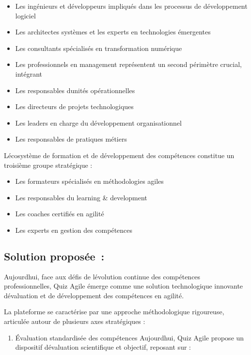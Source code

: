 \documentclass[12pt,a4paper,twoside,openright]{report}
\begin{document}
\begin{itemize}
\item
  Les ingénieurs et développeurs impliqués dans les processus de
  développement logiciel
\item
  Les architectes systèmes et les experts en technologies émergentes
\item
  Les consultants spécialisés en transformation numérique
\item
  Les professionnels en management représentent un second périmètre
  crucial, intégrant
\item
  Les responsables d\textquotesingle unités opérationnelles
\item
  Les directeurs de projets technologiques
\item
  Les leaders en charge du développement organisationnel
\item
  Les responsables de pratiques métiers
\end{itemize}

L\textquotesingle écosystème de formation et de développement des
compétences constitue un troisième groupe stratégique :

\begin{itemize}
\item
  Les formateurs spécialisés en méthodologies agiles
\item
  Les responsables du learning \& development
\item
  Les coaches certifiés en agilité
\item
  Les experts en gestion des compétences
\end{itemize}

\hypertarget{solution-proposee}{%
\subsection{Solution proposée~:}\label{solution-proposee}}

Aujourd\textquotesingle hui, face aux défis de
l\textquotesingle évolution continue des compétences professionnelles,
Quiz Agile émerge comme une solution technologique innovante
d\textquotesingle évaluation et de développement des compétences en
agilité.

La plateforme se caractérise par une approche méthodologique rigoureuse,
articulée autour de plusieurs axes stratégiques :

\begin{enumerate}
\def\labelenumi{\arabic{enumi}.}
\item
  Évaluation standardisée des compétences Aujourd\textquotesingle hui,
  Quiz Agile propose un dispositif d\textquotesingle évaluation
  scientifique et objectif, reposant sur :
\end{enumerate}
\end{document}
